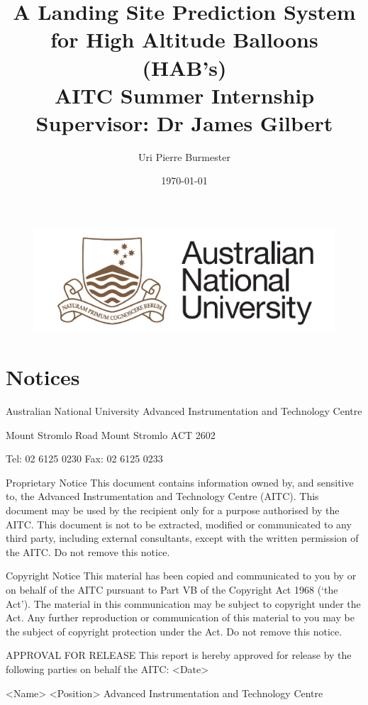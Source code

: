 \documentclass[11pt]{article}
\title{A Landing Site Prediction System for High Altitude Balloons (HAB's) \large \\
	AITC Summer Internship \\
  	Supervisor: Dr James Gilbert}
\author{Uri Pierre Burmester}
\date{\today}
\begin{document}
\begin{figure} \centering
  \includegraphics[width=0.5\linewidth]{ANU.png}
\end{figure}

\maketitle

\newpage

\tableofcontents

\newpage

\section{Notices}

Australian National University
Advanced Instrumentation 
and Technology Centre

Mount Stromlo Road
Mount Stromlo ACT 2602

Tel: 	02 6125 0230
Fax:	02 6125 0233

Proprietary Notice
This document contains information owned by, and sensitive to, the Advanced Instrumentation and Technology Centre (AITC).
This document may be used by the recipient only for a purpose authorised by the AITC. 
This document is not to be extracted, modified or communicated to any third party, including external consultants, except with the written permission of the AITC.
Do not remove this notice.

Copyright Notice
This material has been copied and communicated to you by or on behalf of the AITC pursuant to Part VB of the Copyright Act 1968 (‘the Act’).
The material in this communication may be subject to copyright under the Act. Any further reproduction or communication of this material to you may be the subject of copyright protection under the Act.
Do not remove this notice.

\newpage

APPROVAL FOR RELEASE
This report is hereby approved for release by the following parties on behalf the AITC:
<Date>


<Name>
<Position>
Advanced Instrumentation and Technology Centre

\newpage
\end{document}
